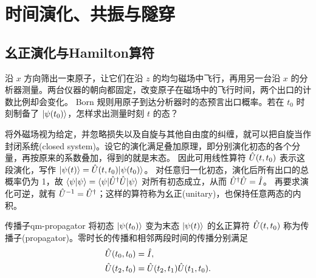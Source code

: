 \chapter{时间演化、共振与隧穿}
\label{ch:dynamics}

\section{幺正演化与Hamilton算符}
沿 $x$ 方向筛出一束原子，让它们在沿 $z$ 的均匀磁场中飞行，再用另一台沿 $x$ 的分析器测量。两台仪器的朝向都固定，改变原子在磁场中的飞行时间，两个出口的计数比例却会变化。
Born 规则用原子到达分析器时的态预言出口概率。若在 $t_0$ 时刻制备了 $\lvert\psi(t_0)\rangle$，怎样求出测量时刻 $t$ 的态？

将外磁场视为给定，并忽略损失以及自旋与其他自由度的纠缠，就可以把自旋当作封闭系统(closed system)。设它的演化满足叠加原理，即分别演化初态的各个分量，再按原来的系数叠加，得到的就是末态。
因此可用线性算符 $\hat{U}(t,t_0)$ 表示这段演化，写作 $\lvert\psi(t)\rangle = \hat{U}(t,t_0)\lvert\psi(t_0)\rangle$。
对任意归一化初态，演化后所有出口的总概率仍为 1，故
$\langle\psi\vert\psi\rangle = \langle\psi\vert\hat{U}^\dagger \hat{U}\vert\psi\rangle$ 对所有初态成立，从而 $\hat{U}^\dagger \hat{U} = \hat{I}$。
再要求演化可逆，就有 $\hat{U}^{-1} = \hat{U}^\dagger$；这样的算符称为幺正(unitary)，也保持任意两态的内积。

\begin{definition}{传播子}{qm-propagator}
    将初态 $\lvert\psi(t_0)\rangle$ 变为末态 $\lvert\psi(t)\rangle$ 的幺正算符 $\hat{U}(t,t_0)$ 称为传播子(propagator)。零时长的传播和相邻两段时间的传播分别满足
    \begin{subequations}
        \begin{align}
            \hat{U}(t_0,t_0) &= \hat{I},\\
            \hat{U}(t_2,t_0) &= \hat{U}(t_2,t_1)\hat{U}(t_1,t_0). \label{eq:propagator-composition}
        \end{align}
    \end{subequations}
\end{definition}

